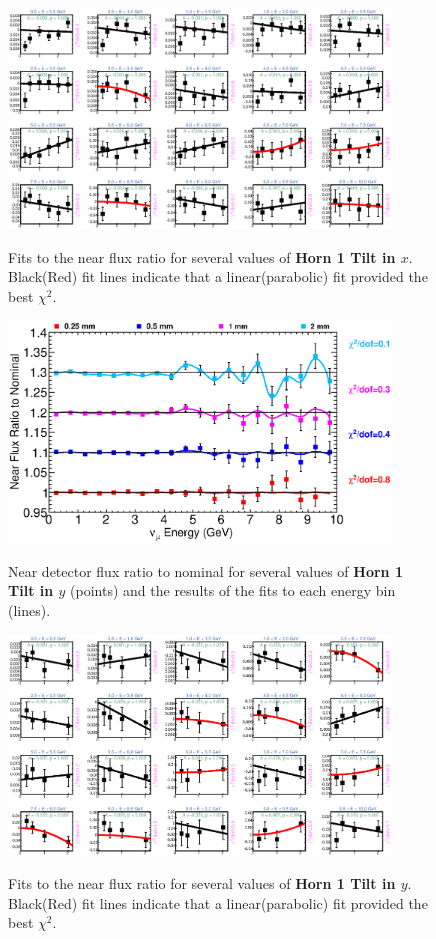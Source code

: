 \begin{figure}[hb]
  \begin{center}
    {\includegraphics[width=4.0in]{figures/Horn1XTilt_near_fits.eps}}
  \end{center}
\caption{ Fits to the near flux ratio for several values of {\bf Horn 1 Tilt in $x$}. Black(Red) fit lines indicate that a linear(parabolic) fit provided the best $\chi^2$. }
\end{figure}

\begin{figure}[ht]
  \begin{center}
    {\includegraphics[width=4.0in]{figures/Horn1YTilt_near_summary.eps}}
  \end{center}
\caption{ Near detector flux ratio to nominal for several values of {\bf Horn 1 Tilt in $y$} (points) and the results of the fits to each energy bin (lines).}
\end{figure}


\begin{figure}[hb]
  \begin{center}
    {\includegraphics[width=4.0in]{figures/Horn1YTilt_near_fits.eps}}
  \end{center}
\caption{ Fits to the near flux ratio for several values of {\bf Horn 1 Tilt in $y$}. Black(Red) fit lines indicate that a linear(parabolic) fit provided the best $\chi^2$. }
\end{figure}


